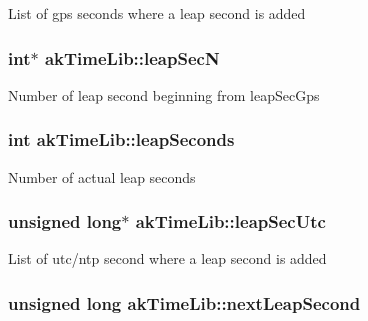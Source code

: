 List of gps seconds where a leap second is added \hypertarget{classakTimeLib_afb895cbc388c984925ab8ebe8361e23e}{
\subsubsection[{leap\-Sec\-N}]{\setlength{\rightskip}{0pt plus 5cm}int$\ast$ ak\-Time\-Lib\-::leap\-Sec\-N\hspace{0.3cm}{\ttfamily [private]}}}\label{classakTimeLib_afb895cbc388c984925ab8ebe8361e23e}
Number of leap second beginning from leap\-Sec\-Gps \hypertarget{classakTimeLib_a1792f1ade7d43742f16880fc3747a472}{
\subsubsection[{leap\-Seconds}]{\setlength{\rightskip}{0pt plus 5cm}int ak\-Time\-Lib\-::leap\-Seconds\hspace{0.3cm}{\ttfamily [private]}}}\label{classakTimeLib_a1792f1ade7d43742f16880fc3747a472}
Number of actual leap seconds \hypertarget{classakTimeLib_a9b0bc2cb3fe5d6544ef93900c00a8b96}{
\subsubsection[{leap\-Sec\-Utc}]{\setlength{\rightskip}{0pt plus 5cm}unsigned long$\ast$ ak\-Time\-Lib\-::leap\-Sec\-Utc\hspace{0.3cm}{\ttfamily [private]}}}\label{classakTimeLib_a9b0bc2cb3fe5d6544ef93900c00a8b96}
List of utc/ntp second where a leap second is added \hypertarget{classakTimeLib_adc38424ed0d1365181685654c1e430dc}{
\subsubsection[{next\-Leap\-Second}]{\setlength{\rightskip}{0pt plus 5cm}unsigned long ak\-Time\-Lib\-::next\-Leap\-Second\hspace{0.3cm}{\ttfamily [private]}}}\label{classakTimeLib_adc38424ed0d1365181685654c1e430dc}
